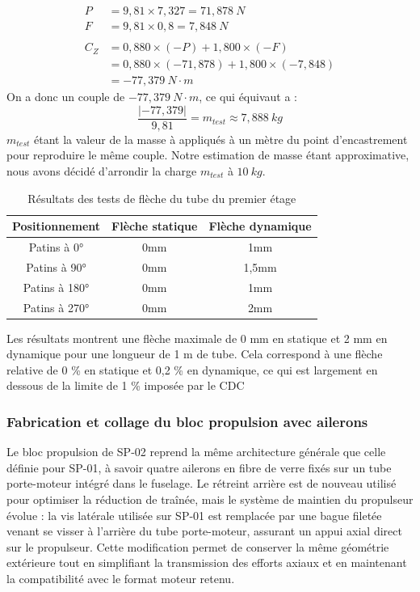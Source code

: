 \begin{align*}
    P &= 9,81 \times 7,327 = 71,878\ N \\
    F &= 9,81 \times 0,8 = 7,848\ N\\
    \\
    C_Z &= 0,880 \times  (- P) + 1,800 \times (- F) \\
    &= 0,880 \times (- 71,878) + 1,800 \times (-7,848) \\
    &= -77,379\ N\cdotp m
\end{align*}
On a donc un couple de $-77,379\ N\cdotp m$, ce qui équivaut a :
$$\frac{|-77,379|}{9,81} = m_{test} \approx 7,888\ kg$$
$m_{test}$ étant la valeur de la masse à appliqués à un mètre du point d'encastrement pour reproduire le même couple.
Notre estimation de masse étant approximative, nous avons décidé d’arrondir la charge $m_{test}$ à $10\ kg$.

\begin{table}[h!]
    \centering
    \begin{tabular}{|c|c|c|}
        \hline
        Positionnement & Flèche statique & Flèche dynamique \\ \hline
        Patins à 0° & 0mm & 1mm \\ \hline
        Patins à 90° & 0mm & 1,5mm \\ \hline
        Patins à 180° & 0mm & 1mm \\ \hline
        Patins à 270° & 0mm & 2mm \\ \hline
        \end{tabular}
    \caption{Résultats des tests de flèche du tube du premier étage}
\end{table}

Les résultats montrent une flèche maximale de 0 mm en statique et 2 mm en dynamique pour une longueur de 1 m de tube. Cela 
correspond à une flèche relative de 0 \% en statique et 0,2 \% en dynamique, ce qui est largement en dessous de la limite de
1 \% imposée par le \gls{CDC} \cite[p.~32]{CDC_BiEtage}

\newpage

\subsubsection{Fabrication et collage du bloc propulsion avec ailerons}
Le bloc propulsion de SP-02 reprend la même architecture générale que celle définie pour SP-01, à savoir quatre ailerons en
fibre de verre fixés sur un tube porte-moteur intégré dans le fuselage. Le rétreint arrière est de nouveau utilisé pour
optimiser la réduction de traînée, mais le système de maintien du propulseur évolue : la vis latérale utilisée sur SP-01 est
remplacée par une bague filetée venant se visser à l’arrière du tube porte-moteur, assurant un appui axial direct sur le
propulseur. Cette modification permet de conserver la même géométrie extérieure tout en simplifiant la transmission des efforts
axiaux et en maintenant la compatibilité avec le format moteur retenu.\\

